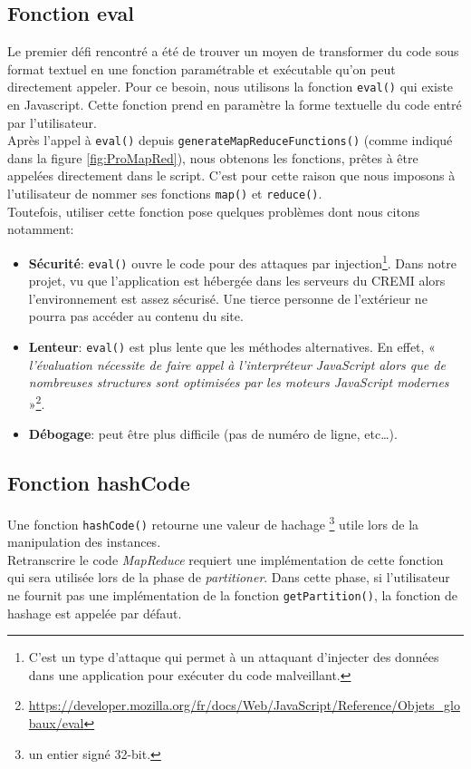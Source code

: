 \subsection{Fonction eval}
Le premier défi rencontré a été de trouver un moyen de transformer du code sous format textuel en une fonction paramétrable et exécutable qu'on peut directement appeler. Pour ce besoin, nous utilisons la fonction {\tt eval()} qui existe en Javascript. Cette fonction prend en paramètre la forme textuelle du code entré par l'utilisateur. \\

Après l'appel à {\tt eval()} depuis {\tt generateMapReduceFunctions()} (comme indiqué dans la figure \ref{fig:ProMapRed}), nous obtenons les fonctions, prêtes à être appelées directement dans le script. C'est pour cette raison que nous imposons à l'utilisateur de nommer ses fonctions {\tt map()} et {\tt reduce()}.\\

Toutefois, utiliser cette fonction pose quelques problèmes dont nous citons notamment:

\begin{itemize}
\item {\bf Sécurité}: {\tt eval()} ouvre le code pour des attaques par injection\footnote{C'est un type d'attaque qui permet à un attaquant d'injecter des données dans une application pour exécuter du code malveillant.}. Dans notre projet, vu  que l'application est hébergée dans les serveurs du CREMI alors l'environnement est assez sécurisé. Une tierce personne de l'extérieur ne pourra pas accéder au contenu du site.
\item {\bf Lenteur}: {\tt eval()} est plus lente que les méthodes alternatives. En effet, « {\it l'évaluation nécessite de faire appel à l'interpréteur JavaScript alors que de nombreuses structures sont optimisées par les moteurs JavaScript modernes} »\footnote{\url{https://developer.mozilla.org/fr/docs/Web/JavaScript/Reference/Objets\_globaux/eval}}.
\item {\bf Débogage}: peut être plus difficile (pas de numéro de ligne, etc…).
\end{itemize}

\subsection{Fonction hashCode}
Une fonction {\tt hashCode()} retourne une valeur de hachage \footnote{un entier signé 32-bit.} utile lors de la manipulation des instances. \\
Retranscrire le code {\it MapReduce} requiert une implémentation de cette fonction qui sera utilisée lors de la phase de {\it partitioner}. Dans cette phase, si l'utilisateur ne fournit pas une implémentation de la fonction {\tt getPartition()}, la fonction de hashage est appelée par défaut.\\

